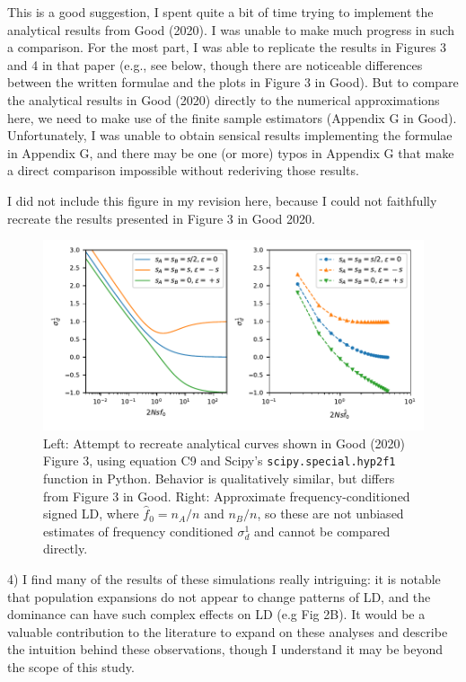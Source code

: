 \documentclass{article}
\newenvironment{response}%
  {\list{}{\leftmargin=0.5in\rightmargin=0.5in\color{blue}}\item[]}%
  {\endlist}
\begin{document}
\begin{response}
    This is a good suggestion, I spent quite a bit of time trying to implement
    the analytical results from Good (2020). I was unable to make much
    progress in such a comparison. For the most part, I was able to replicate
    the results in Figures 3 and 4 in that paper (e.g., see below, though there
    are noticeable differences between the written formulae and the plots in
    Figure 3 in Good).
    But to compare the analytical results in Good (2020) directly
    to the numerical approximations
    here, we need to make use of the finite sample estimators (Appendix G in Good).
    Unfortunately, I was unable to obtain sensical results implementing the
    formulae in Appendix G, and there may be one (or more) typos in Appendix G
    that make a direct comparison impossible without rederiving those results.

    I did not include this figure in my revision here, because I could not
    faithfully recreate the results presented in Figure 3 in Good 2020.
\end{response}

\begin{figure}[h!]
    \centering
    \includegraphics{./good_comparison}
    \caption{
        Left: Attempt to recreate analytical curves shown in Good (2020) Figure 3,
        using equation C9 and Scipy's \texttt{scipy.special.hyp2f1} function in Python.
        Behavior is qualitatively similar, but differs from Figure 3 in Good. 
        Right: Approximate frequency-conditioned signed LD, where
        $\hat{f}_0 = n_A/n$ and $n_B/n$, so these
        are not unbiased estimates of frequency conditioned $\sigma_d^1$ and cannot
        be compared directly.
    }
    \label{fig:good}
\end{figure}

4) I find many of the results of these simulations really intriguing: it is
notable that population expansions do not appear to change patterns of LD, and
the dominance can have such complex effects on LD (e.g Fig 2B). It would be a
valuable contribution to the literature to expand on these analyses and
describe the intuition behind these observations, though I understand it may be
beyond the scope of this study.
\end{document}
